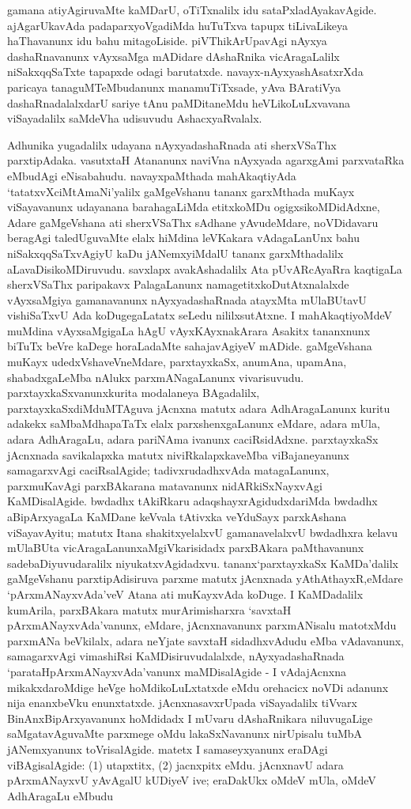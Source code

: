 gamana atiyAgiruvaMte kaMDarU, oTiTxnalilx idu sataPxladAyakavAgide. ajAgarUkavAda padaparxyoVgadiMda huTuTxva tapupx tiLivaLikeya haThavanunx idu bahu mitagoLiside. piVThikArUpavAgi nAyxya dashaRnavanunx vAyxsaMga mADidare dAshaRnika vicAragaLalilx niSakxqqSaTxte tapapxde odagi barutatxde. navayx-nAyxyashAsatxrXda paricaya tanaguMTeMbudanunx manamuTiTxsade, yAva BAratiVya dashaRnadalalxdarU sariye tAnu paMDitaneMdu heVLikoLuLxvavana viSayadalilx saMdeVha udisuvudu AshacxyaRvalalx.

Adhunika yugadalilx udayana nAyxyadashaRnada ati sherxVSaThx parxtipAdaka. \hbox{vasutxtaH} Atananunx naviVna nAyxyada agarxgAmi parxvataRka eMbudAgi eNisabahudu. navayx\-paMthada mahAkaqtiyAda `tatatxvXciMtAmaNi'yalilx gaMgeVshanu tananx garxMthada muKayx viSaya\-vanunx udayanana barahagaLiMda etitxkoMDu ogigxsikoMDidAdxne, Adare gaMgeVshana ati sherxVSaThx sAdhane yAvudeMdare, noVDidavaru beragAgi taledUguvaMte elalx hiMdina leVKa\-kara vAdagaLanUnx bahu niSakxqqSaTxvAgiyU kaDu jANemxyiMdalU tananx garxMthadalilx aLa\-vaDisikoMDiruvudu. savxlapx avakAshadalilx Ata pUvARcAyaRra kaqtigaLa sherxVSaThx paripakavx PalagaLanunx namagetitxkoDutAtxnalalxde vAyxsaMgiya gamanavanunx nAyxyadashaRnada atayxMta mUlaBUtavU vishiSaTxvU Ada koDugegaLatatx seLedu nililxsutAtxne. I mahAkaqti\-yoMdeV muMdina vAyxsaMgigaLa hAgU vAyxKAyxnakArara Asakitx tananxnunx biTuTx beVre kaDege horaLa\-daMte sahajavAgiyeV mADide. gaMgeVshana muKayx udedxVshaveVneMdare, parxtayxkaSx, anu\-mAna, upamAna, shabadxgaLeMba nAlukx parxmANagaLanunx vivarisuvudu. parxtayxkaSxvanunx\break kurita modalaneya BAgadalilx, parxtayxkaSxdiMduMTAguva jAcnxna matutx adara AdhAragaLanunx kuritu adakekx saMbaMdhapaTaTx elalx parxshenxgaLanunx eMdare, adara mUla, adara AdhAragaLu, adara pariNAma ivanunx caciRsidAdxne. parxtayxkaSx jAcnxnada savikalapxka matutx niviRkalapxkaveMba viBajaneyanunx samagarxvAgi caciRsalAgide; tadivxrudadhxvAda matagaLanunx, parxmuKavAgi parxBAkarana matavanunx nidARkiSxNayxvAgi KaMDisalAgide. bwdadhx tAkiRkaru adaqshayxrAgidudxdariMda bwdadhx aBipArxyagaLa KaMDane keVvala tAtivxka veYduSayx parxkAshana viSaya\-vAyitu; matutx Itana shakitxyelalxvU gamanavelalxvU bwdadhxra kelavu mUlaBUta vicAragaLanunx\break aMgiVkarisidadx parxBAkara paMthavanunx sadebaDiyuvudaralilx niyukatxvAgidadxvu. tananx\break `parxtayxkaSx KaMDa'dalilx gaMgeVshanu parxtipAdisiruva parxme matutx jAcnxnada yAthAthayxR,\break eMdare `pArxmANayxvAda'veV Atana ati muKayxvAda koDuge. I KaMDadalilx kumA\-rila, parxBAkara matutx murArimisharxra `savxtaH pArxmANayxvAda'vanunx, eMdare, jAcnxnavanunx parxmANisalu matotxMdu parxmANa beVkilalx, adara neYjate savxtaH sidadhxvAdudu eMba vAdavanunx, samagarxvAgi vimashiRsi KaMDisiruvudalalxde, nAyxyadashaRnada `parataH\break\-pArxmANayxvAda'vanunx maMDisalAgide - I vAdajAcnxna mikakxdaroMdige heVge hoMdi\-koLuLxtatxde eMdu orehacicx noVDi adanunx nija enanxbeVku enunxtatxde. jAcnxnasavxrUpada viSayadalilx tiVvarx BinAnxBipArxyavanunx hoMdidadx I mUvaru dAshaRnikara niluvu\-gaLige saMgatavAguvaMte parxmege oMdu lakaSxNavanunx nirUpisalu tuMbA jANemxyanunx toVrisalAgide. matetx I samaseyxyanunx eraDAgi viBAgisalAgide: (1) utapxtitx, (2) jacnxpitx eMdu. jAcnxnavU adara pArxmANayxvU yAvAgalU kUDiyeV ive; eraDakUkx oMdeV mUla, oMdeV AdhAragaLu eMbudu 
